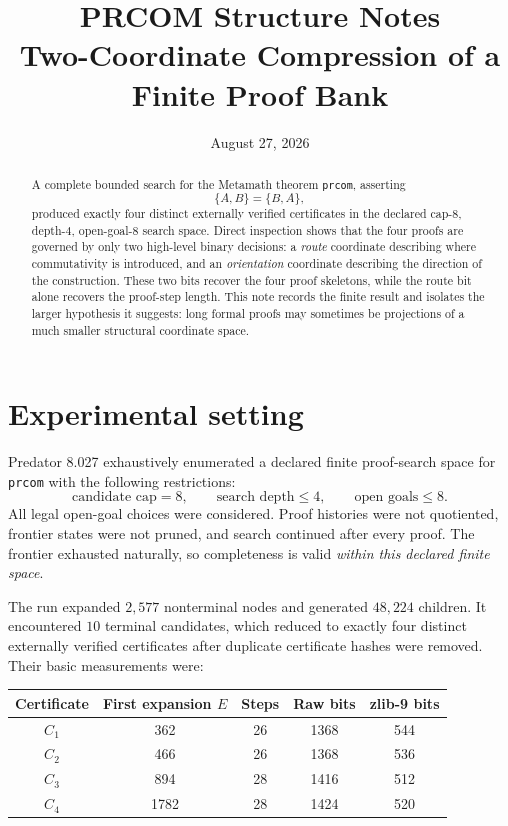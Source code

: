 \documentclass[11pt]{article}
\title{\textbf{PRCOM Structure Notes}\\
\large Two-Coordinate Compression of a Finite \prcom{} Proof Bank}
\author{}
\date{August 27, 2026}
\newcommand{\prcom}{\texttt{prcom}}
\begin{document}
\maketitle
\vspace{-1.5em}

\begin{abstract}
A complete bounded search for the Metamath theorem \prcom{}, asserting
\[
\{A,B\}=\{B,A\},
\]
produced exactly four distinct externally verified certificates in the declared
cap-$8$, depth-$4$, open-goal-$8$ search space. Direct inspection shows that the
four proofs are governed by only two high-level binary decisions: a \emph{route}
coordinate describing where commutativity is introduced, and an \emph{orientation}
coordinate describing the direction of the construction. These two bits recover
the four proof skeletons, while the route bit alone recovers the proof-step
length. This note records the finite result and isolates the larger hypothesis
it suggests: long formal proofs may sometimes be projections of a much smaller
structural coordinate space.
\end{abstract}

\section{Experimental setting}

Predator 8.027 exhaustively enumerated a declared finite proof-search space for
\prcom{} with the following restrictions:
\[
\text{candidate cap}=8,\qquad
\text{search depth}\le 4,\qquad
\text{open goals}\le 8.
\]
All legal open-goal choices were considered. Proof histories were not quotiented,
frontier states were not pruned, and search continued after every proof. The
frontier exhausted naturally, so completeness is valid \emph{within this declared
finite space}.

The run expanded $2{,}577$ nonterminal nodes and generated $48{,}224$ children.
It encountered $10$ terminal candidates, which reduced to exactly four distinct
externally verified certificates after duplicate certificate hashes were removed.
Their basic measurements were:

\begin{center}
\begin{tabular}{@{}ccccc@{}}
\toprule
Certificate & First expansion $E$ & Steps & Raw bits & zlib-9 bits \\
\midrule
$C_1$ & 362  & 26 & 1368 & 544 \\
$C_2$ & 466  & 26 & 1368 & 536 \\
$C_3$ & 894  & 28 & 1416 & 512 \\
$C_4$ & 1782 & 28 & 1424 & 520 \\
\bottomrule
\end{tabular}
\end{center}
\end{document}
